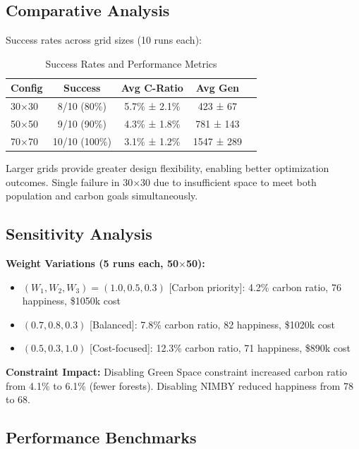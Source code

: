 \documentclass[conference]{IEEEtran}
\begin{document}
\subsection{Comparative Analysis}

Success rates across grid sizes (10 runs each):

\begin{table}[htbp]
\caption{Success Rates and Performance Metrics}
\begin{center}
\begin{tabular}{lcccc}
\toprule
\textbf{Config} & \textbf{Success} & \textbf{Avg C-Ratio} & \textbf{Avg Gen} \\
\midrule
30$\times$30 & 8/10 (80\%) & 5.7\% ± 2.1\% & 423 ± 67 \\
50$\times$50 & 9/10 (90\%) & 4.3\% ± 1.8\% & 781 ± 143 \\
70$\times$70 & 10/10 (100\%) & 3.1\% ± 1.2\% & 1547 ± 289 \\
\bottomrule
\end{tabular}
\label{tab:success}
\end{center}
\end{table}

Larger grids provide greater design flexibility, enabling better optimization outcomes. Single failure in 30$\times$30 due to insufficient space to meet both population and carbon goals simultaneously.

\subsection{Sensitivity Analysis}

\textbf{Weight Variations (5 runs each, 50$\times$50):}
\begin{itemize}
    \item $(W_1, W_2, W_3) = (1.0, 0.5, 0.3)$ [Carbon priority]: 4.2\% carbon ratio, 76 happiness, \$1050k cost
    \item $(0.7, 0.8, 0.3)$ [Balanced]: 7.8\% carbon ratio, 82 happiness, \$1020k cost
    \item $(0.5, 0.3, 1.0)$ [Cost-focused]: 12.3\% carbon ratio, 71 happiness, \$890k cost
\end{itemize}

\textbf{Constraint Impact:} Disabling Green Space constraint increased carbon ratio from 4.1\% to 6.1\% (fewer forests). Disabling NIMBY reduced happiness from 78 to 68.

\subsection{Performance Benchmarks}
\end{document}
